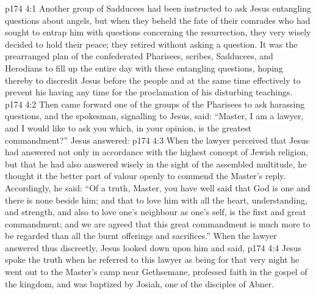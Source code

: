 \vs p174 4:1 Another group of Sadducees had been instructed to ask Jesus entangling questions about angels, but when they beheld the fate of their comrades who had sought to entrap him with questions concerning the resurrection, they very wisely decided to hold their peace; they retired without asking a question. It was the prearranged plan of the confederated Pharisees, scribes, Sadducees, and Herodians to fill up the entire day with these entangling questions, hoping thereby to discredit Jesus before the people and at the same time effectively to prevent his having any time for the proclamation of his disturbing teachings.
\vs p174 4:2 Then came forward one of the groups of the Pharisees to ask harassing questions, and the spokesman, signalling to Jesus, said: “Master, I am a lawyer, and I would like to ask you which, in your opinion, is the greatest commandment?” Jesus answered: 
\vs p174 4:3 When the lawyer perceived that Jesus had answered not only in accordance with the highest concept of Jewish religion, but that he had also answered wisely in the sight of the assembled multitude, he thought it the better part of valour openly to commend the Master’s reply. Accordingly, he said: “Of a truth, Master, you have well said that God is one and there is none beside him; and that to love him with all the heart, understanding, and strength, and also to love one’s neighbour as one’s self, is the first and great commandment; and we are agreed that this great commandment is much more to be regarded than all the burnt offerings and sacrifices.” When the lawyer answered thus discreetly, Jesus looked down upon him and said, 
\vs p174 4:4 \pc Jesus spoke the truth when he referred to this lawyer as being  for that very night he went out to the Master’s camp near Gethsemane, professed faith in the gospel of the kingdom, and was baptized by Josiah, one of the disciples of Abner.
